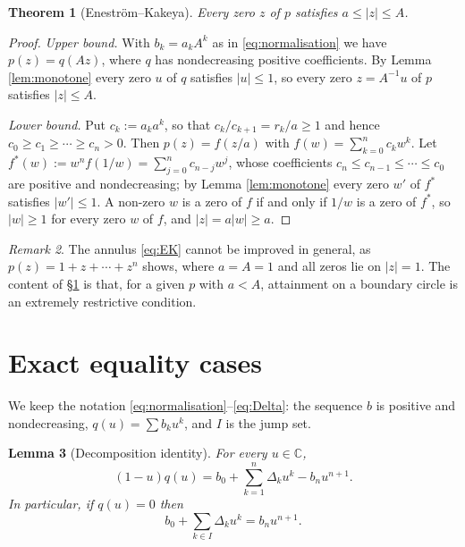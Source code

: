 \documentclass[11pt]{amsart}
\theoremstyle{plain}
\newtheorem{theorem}{Theorem}[section]
\newtheorem{lemma}[theorem]{Lemma}
\theoremstyle{definition}
\theoremstyle{remark}
\newtheorem{remark}[theorem]{Remark}
\newcommand{\C}{\mathbb{C}}
\newcommand{\abs}[1]{\lvert #1\rvert}
\begin{document}
\begin{theorem}[Enestr\"om--Kakeya]\label{thm:EK}
Every zero $z$ of $p$ satisfies $a\le\abs{z}\le A$.
\end{theorem}

\begin{proof}
\emph{Upper bound.} With $b_k=a_kA^{k}$ as in \eqref{eq:normalisation} we have $p(z)=q(Az)$,
where $q$ has nondecreasing positive coefficients. By Lemma \ref{lem:monotone} every zero
$u$ of $q$ satisfies $\abs{u}\le1$, so every zero $z=A^{-1}u$ of $p$ satisfies
$\abs{z}\le A$.

\emph{Lower bound.} Put $c_k:=a_ka^{k}$, so that $c_k/c_{k+1}=r_k/a\ge1$ and hence
$c_0\ge c_1\ge\cdots\ge c_n>0$. Then $p(z)=f(z/a)$ with $f(w)=\sum_{k=0}^{n}c_kw^{k}$. Let
$f^{*}(w):=w^{n}f(1/w)=\sum_{j=0}^{n}c_{n-j}w^{j}$, whose coefficients
$c_n\le c_{n-1}\le\cdots\le c_0$ are positive and nondecreasing; by Lemma \ref{lem:monotone}
every zero $w'$ of $f^{*}$ satisfies $\abs{w'}\le1$. A non-zero $w$ is a zero of $f$ if and
only if $1/w$ is a zero of $f^{*}$, so $\abs{w}\ge1$ for every zero $w$ of $f$, and
$\abs{z}=a\abs{w}\ge a$.
\end{proof}

\begin{remark}\label{rem:sharp}
The annulus \eqref{eq:EK} cannot be improved in general, as $p(z)=1+z+\cdots+z^{n}$ shows,
where $a=A=1$ and all zeros lie on $\abs{z}=1$. The content of \S\ref{sec:rigidity} is
that, for a given $p$ with $a<A$, attainment on a boundary circle is an extremely
restrictive condition.
\end{remark}

\section{Exact equality cases}\label{sec:rigidity}

We keep the notation \eqref{eq:normalisation}--\eqref{eq:Delta}: the sequence $b$ is
positive and nondecreasing, $q(u)=\sum b_ku^{k}$, and $I$ is the jump set.

\begin{lemma}[Decomposition identity]\label{lem:key}
For every $u\in\C$,
\begin{equation}\label{eq:key}
(1-u)q(u)=b_0+\sum_{k=1}^{n}\Delta_ku^{k}-b_nu^{n+1}.
\end{equation}
In particular, if $q(u)=0$ then
\begin{equation}\label{eq:star}
b_0+\sum_{k\in I}\Delta_ku^{k}=b_nu^{n+1}.
\end{equation}
\end{lemma}
\end{document}

